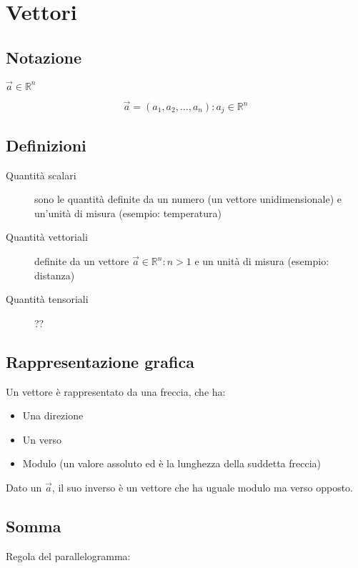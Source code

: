 \documentclass{article}
\begin{document}
\section{Vettori}

\subsection{Notazione}

$\vec{a} \in \mathbb{R}^n$

$$
\vec{a} = (a_1, a_2, \dots, a_n) : a_j \in \mathbb{R}^n
$$

\subsection{Definizioni}

\begin{description}
\item[Quantità scalari] sono le quantità definite da un numero (un vettore unidimensionale) e un'unità di misura (esempio: temperatura)
\item[Quantità vettoriali] definite da un vettore $\vec{a} \in \mathbb{R}^n : n > 1$ e un unità di misura (esempio: distanza)
\item[Quantità tensoriali] ??
\end{description}

\subsection{Rappresentazione grafica}

Un vettore è rappresentato da una freccia, che ha:

\begin{itemize}
\item Una direzione
\item Un verso
\item Modulo (un valore assoluto ed è la lunghezza della suddetta freccia)
\end{itemize}

\noindent
Dato un $\vec{a}$, il suo inverso è un vettore che ha uguale modulo ma verso opposto.

\subsection{Somma}

Regola del parallelogramma:
\end{document}
